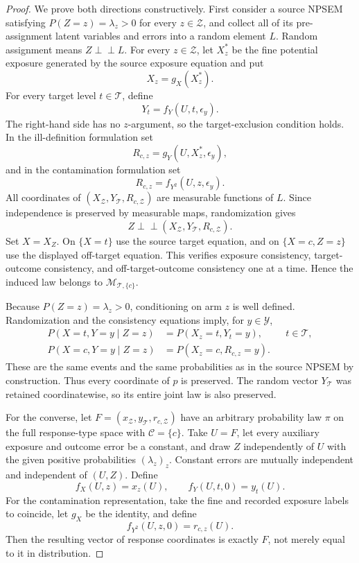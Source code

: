 \documentclass{article}
\begin{document}
\begin{proof}
We prove both directions constructively.  First consider a source NPSEM satisfying \(P(Z=z)=\lambda_z>0\) for every \(z\in\mathcal Z\), and collect all of its pre-assignment latent variables and errors into a random element \(L\).  Random assignment means \(Z\perp\!\!\!\perp L\).  For every \(z\in\mathcal Z\), let \(X_z^*\) be the fine potential exposure generated by the source exposure equation and put
\[
X_z=g_X(X_z^*).
\]
For every target level \(t\in\mathcal T\), define
\[
Y_t=f_Y(U,t,\epsilon_y).
\]
The right-hand side has no \(z\)-argument, so the target-exclusion condition holds.  In the ill-definition formulation set
\[
R_{c,z}=g_Y(U,X_z^*,\epsilon_y),
\]
and in the contamination formulation set
\[
R_{c,z}=f_{Y^2}(U,z,\epsilon_y).
\]
All coordinates of \((X_{\mathcal Z},Y_{\mathcal T},R_{c,\mathcal Z})\) are measurable functions of \(L\).  Since independence is preserved by measurable maps, randomization gives
\[
Z\perp\!\!\!\perp(X_{\mathcal Z},Y_{\mathcal T},R_{c,\mathcal Z}).
\]
Set \(X=X_Z\).  On \(\{X=t\}\) use the source target equation, and on \(\{X=c,Z=z\}\) use the displayed off-target equation.  This verifies exposure consistency, target-outcome consistency, and off-target-outcome consistency one at a time.  Hence the induced law belongs to \(\mathcal M_{\mathcal T,\{c\}}\).

Because \(P(Z=z)=\lambda_z>0\), conditioning on arm \(z\) is well defined.  Randomization and the consistency equations imply, for \(y\in\mathcal Y\),
\[
\begin{aligned}
P(X=t,Y=y\mid Z=z)
 &=P(X_z=t,Y_t=y), &&t\in\mathcal T,\\
P(X=c,Y=y\mid Z=z)
 &=P(X_z=c,R_{c,z}=y).
\end{aligned}
\]
These are the same events and the same probabilities as in the source NPSEM by construction.  Thus every coordinate of \(p\) is preserved.  The random vector \(Y_{\mathcal T}\) was retained coordinatewise, so its entire joint law is also preserved.

For the converse, let \(F=(x_{\mathcal Z},y_{\mathcal T},r_{c,\mathcal Z})\) have an arbitrary probability law \(\pi\) on the full response-type space with \(\mathcal C=\{c\}\).  Take \(U=F\), let every auxiliary exposure and outcome error be a constant, and draw \(Z\) independently of \(U\) with the given positive probabilities \((\lambda_z)_z\).  Constant errors are mutually independent and independent of \((U,Z)\).  Define
\[
f_X(U,z)=x_z(U),
\qquad
f_Y(U,t,0)=y_t(U).
\]
For the contamination representation, take the fine and recorded exposure labels to coincide, let \(g_X\) be the identity, and define
\[
f_{Y^2}(U,z,0)=r_{c,z}(U).
\]
Then the resulting vector of response coordinates is exactly \(F\), not merely equal to it in distribution.


\end{proof}
\end{document}
